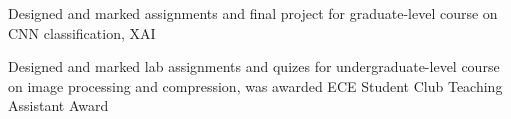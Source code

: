 \documentclass[letterpaper, 12pt]{cv_style}
\begin{document}

\begin{ditem}
	\item Designed and marked assignments and final project for graduate-level course on CNN classification, XAI
\end{ditem}

\begin{ditem}
	\item Designed and marked lab assignments and quizes for undergraduate-level course on image processing and compression, was awarded ECE Student Club Teaching Assistant Award
\end{ditem}

%
\end{document}
